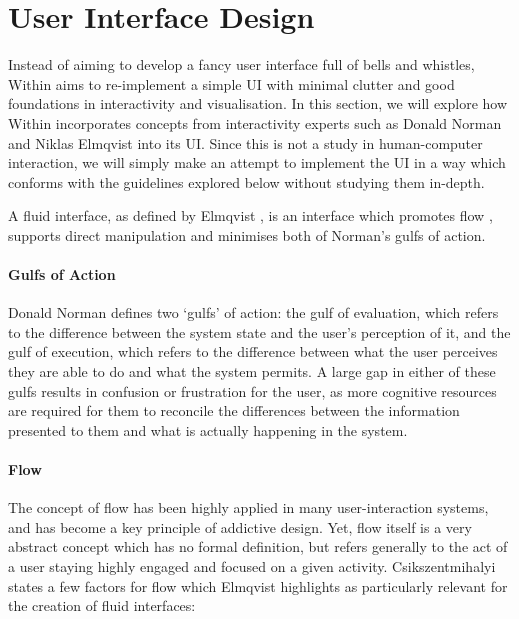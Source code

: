\section{User Interface Design}
Instead of aiming to develop a fancy user interface full of bells and whistles, Within aims to re-implement a simple UI with minimal clutter and good foundations in interactivity and visualisation. In this section, we will explore how Within incorporates concepts from interactivity experts such as Donald Norman and Niklas Elmqvist into its UI. Since this is not a study in human-computer interaction, we will simply make an attempt to implement the UI in a way which conforms with the guidelines explored below without studying them in-depth.

A fluid interface, as defined by Elmqvist \cite{elmqvist2011fluid}, is an interface which promotes flow \cite{csikszentmihalyi1990flow}, supports direct manipulation\cite{shneiderman19931} and minimises both of Norman's \cite{norman1986user} gulfs of action.

\paragraph{Gulfs of Action} Donald Norman defines two `gulfs' of action: the gulf of evaluation, which refers to the difference between the system state and the user's perception of it, and the gulf of execution, which refers to the difference between what the user perceives they are able to do and what the system permits. A large gap in either of these gulfs results in confusion or frustration for the user, as more cognitive resources are required for them to reconcile the differences between the information presented to them and what is actually happening in the system.

\paragraph{Flow} The concept of flow has been highly applied in many user-interaction systems, and has become a key principle of addictive design. Yet, flow itself is a very abstract concept which has no formal definition, but refers generally to the act of a user staying highly engaged and focused on a given activity. Csikszentmihalyi \cite{csikszentmihalyi1990flow} states a few factors for flow which Elmqvist \cite{elmqvist2011fluid} highlights as particularly relevant for the creation of fluid interfaces:

